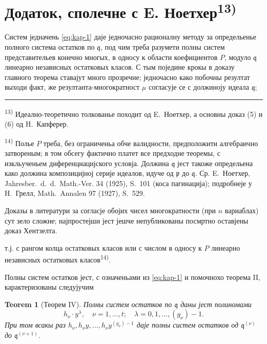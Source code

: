 \documentclass[11pt]{article}
\newcommand{\foreign}[1]{#1}
\theoremstyle{plain}
\newtheorem{satz}{Teorem}
\begin{document}
\newpage
\section*{Додаток, сполечне с E. Ноетхер\textsuperscript{13)}}

Систем једначень \eqref{eq:kap-1} даје једночасно рационалну
методу за определьенье полного система остатков по $\mathfrak{q}$,
под чим треба разумети полны систем представительев конечно многых,
в односу к области коефициентов $P$, модуло $\mathfrak{q}$ линеарно
независных остатковых класов. С тым поједине крокы в доказу
главного теорема ставајут много прозречне; једночасно како
побочны резултат выходи факт, же резултанта-многократност $\mu$
согласује се с должиноју идеала $\mathfrak{q}$;

\vspace{0.5em}
\noindent\rule{\textwidth}{0.4pt}
\vspace{0.3em}

{\footnotesize
\textsuperscript{13)} Идеално-теоретично толкованье походит од E.\ Ноетхер, а основны
доказ (5) и (6) од H.\ Капферер.

\textsuperscript{14)} Полье $P$ треба, без ограниченьа обче валидности, предположити
алгебраично затвореным; в том обсегу фактично платет все предходне
теоремы, с изкльученьем диференциацијского условја. Должина
$\mathfrak{q}$ јест такоже определьена како должина композицијној
серије идеалов, идуче од $\mathfrak{p}$ до $\mathfrak{q}$. Ср.
E.\ Ноетхер, \foreign{Jahresber.\ d.\ d.\ Math.-Ver.} 34 (1925), S.~101
(коса пагинација); подробнеје у H.\ Грелл, \foreign{Math.\ Annalen} 97
(1927), S.~529.

Доказы в литератури за согласје обојих чисел многократности (при
$n$ вариаблах) сут зело сложне; најпростејши јест јешче непубликованы
посмртно оставјены доказ Хентзелта.
}

\vspace{1em}
т.ј. с рангом колца остатковых класов или с числом в односу к $P$
линеарно независных остатковых класов\textsuperscript{14)}.

Полны систем остатков јест, с означеньами из \eqref{eq:kap-1} и
помочнохо теорема II, карактеризованы следујучим

\begin{satz}[Теорем IV]\label{satz:kap-IV}
Полны систем остатков по $\mathfrak{q}$ даны јест полиномами
\[
h_{\nu} \cdot y^{\lambda}, \quad \nu = 1, \ldots, t; \quad \lambda = 0, 1, \ldots, (g_{\nu})-1.
\]
При том всакы раз
$h_{\nu}, h_{\nu}y, \ldots, h_{\nu}y^{(g_{\nu})-1}$ даје полны
систем остатков од $\mathfrak{q}^{(\nu)}$ до
$\mathfrak{q}^{(\nu+1)}$.
\end{satz}
\end{document}

